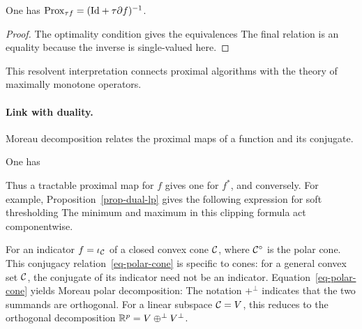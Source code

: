 \begin{prop}
	One has $\operatorname{Prox}_{\tau f} = (\mathrm{Id}+\tau\partial f)^{-1}$.
\end{prop}
\begin{proof}
The optimality condition gives the equivalences
The final relation is an equality because the inverse is single-valued here.
\end{proof}

This resolvent interpretation connects proximal algorithms with the theory of maximally monotone operators.

\paragraph{Link with duality.}

Moreau decomposition relates the proximal maps of a function and its conjugate.

\begin{thm}
	One has
\end{thm}

Thus a tractable proximal map for $f$ gives one for $f^*$, and conversely.
%
For example, Proposition~\ref{prop-dual-lp} gives the following expression for soft thresholding
The minimum and maximum in this clipping formula act componentwise.

For an indicator $f=\iota_{\mathcal{C}}$ of a closed convex cone $\mathcal{C}$,
where $\mathcal{C}^\circ$ is the polar cone. This conjugacy relation~\eqref{eq-polar-cone} is specific to cones: for a general convex set $\mathcal{C}$, the conjugate of its indicator need not be an indicator.
%
Equation~\eqref{eq-polar-cone} yields Moreau polar decomposition:
The notation $+^\bot$ indicates that the two summands are orthogonal.
%
For a linear subspace $\mathcal{C}=V$, this reduces to the orthogonal decomposition $\mathbb{R}^p = V \oplus^\bot V^\bot$.

